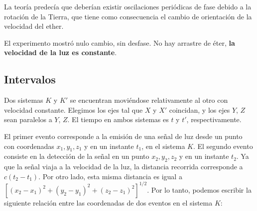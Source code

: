 \documentclass[]{article}
\numberwithin{equation}{section}
\begin{document}
\begin{figure}
\end{figure}

La teoría predecía que deberían existir oscilaciones periódicas de fase debido a la rotación de la Tierra, que tiene como consecuencia el cambio de orientación de la velocidad del ether.

El experimento mostró nulo cambio, sin desfase. No hay arrastre de éter, \textbf{la velocidad de la luz es constante}.

\subsection{Intervalos}

Dos sistemas $K$ y $K'$ se encuentran moviéndose relativamente al otro con velocidad constante. Elegimos los ejes tal que $X$ y $X'$ coincidan, y los ejes $Y$, $Z$ sean paralelos a $Y$, $Z$. El tiempo en ambos sistemas es $t$ y $t'$, respectivamente.

El primer evento corresponde a la emisión de una señal de luz desde un punto con coordenadas $x_1,y_1,z_1$ y en un instante $t_1$, en el sistema $K$. El segundo evento consiste en la detección de la señal en un punto $x_2,y_2,z_2$ y en un instante $t_2$. Ya que la señal viaja a la velocidad de la luz, la distancia recorrida corresponde a $c(t_2-t_1)$. Por otro lado, esta misma distancia es igual a $\left[(x_2-x_1)^2+(y_2-y_1)^2+(z_2-z_1)^2\right]^{1/2}$. Por lo tanto, podemos escribir la siguiente relación entre las coordenadas de dos eventos en el sistema $K$:
\end{document}
